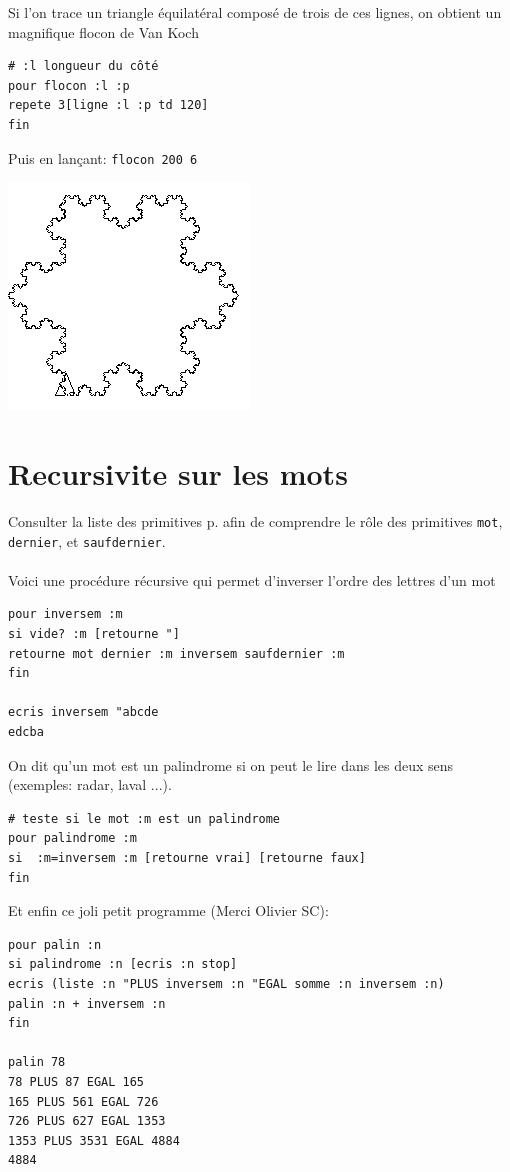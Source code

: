 Si l'on trace un triangle équilatéral composé de trois de ces lignes, on obtient un magnifique flocon de Van Koch
\begin{verbatim}
# :l longueur du côté
pour flocon :l :p
repete 3[ligne :l :p td 120]
fin
\end{verbatim}
Puis en lançant: \texttt{flocon 200 6}
\begin{center}
\includegraphics{images/flocon.png}
\end{center}
\section{Recursivite sur les mots}
\noindent Consulter la liste des primitives p.\pageref{liste-prim} afin de comprendre le rôle des primitives \texttt{mot}, \texttt{dernier}, et \texttt{saufdernier}.\\ \\
Voici une procédure récursive qui permet d'inverser l'ordre des lettres d'un mot
\begin{verbatim}
pour inversem :m
si vide? :m [retourne "]  
retourne mot dernier :m inversem saufdernier :m
fin

ecris inversem "abcde
edcba
\end{verbatim}
On dit qu'un mot est un palindrome si on peut le lire dans les deux sens (exemples: radar, laval ...).
\begin{verbatim}
# teste si le mot :m est un palindrome
pour palindrome :m
si  :m=inversem :m [retourne vrai] [retourne faux] 
fin
\end{verbatim}
Et enfin ce joli petit programme (Merci Olivier SC):
\begin{verbatim}
pour palin :n
si palindrome :n [ecris :n stop]
ecris (liste :n "PLUS inversem :n "EGAL somme :n inversem :n)
palin :n + inversem :n 
fin

palin 78
78 PLUS 87 EGAL 165
165 PLUS 561 EGAL 726
726 PLUS 627 EGAL 1353
1353 PLUS 3531 EGAL 4884
4884
\end{verbatim}
